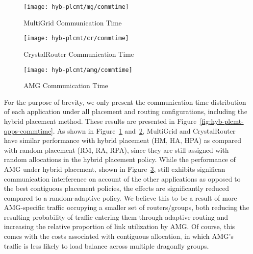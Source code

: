 
\begin{figure*}[t!]
    \centering
    \begin{subfigure}[t]{0.32\textwidth}
        \centering
        \texttt{[image: hyb-plcmt/mg/commtime]}
        \caption{MultiGrid Communication Time}
        \label{fig:hyb-plcmt-mg-commtime}
    \end{subfigure}\hfill
    \begin{subfigure}[t]{0.32\textwidth}
        \centering
        \texttt{[image: hyb-plcmt/cr/commtime]}
        \caption{CrystalRouter Communication Time}
        \label{fig:hyb-plcmt-cr-commtime}
    \end{subfigure}\hfill
    \begin{subfigure}[t]{0.32\textwidth}
        \centering
        \texttt{[image: hyb-plcmt/amg/commtime]}
        \caption{AMG Communication Time}
        \label{fig:hyb-plcmt-amg-commtime}
    \end{subfigure}
   \caption{Application communication time. Workload~ is running with all placement and routing configurations.}
   \label{fig:hyb-plcmt-apps-commtime}
\end{figure*}

For the purpose of brevity, we only present the
communication time distribution of each application under all placement and routing configurations, including the hybrid placement method. These results are presented in Figure~\ref{fig:hyb-plcmt-apps-commtime}. 
As shown in Figure~\ref{fig:hyb-plcmt-mg-commtime} and~\ref{fig:hyb-plcmt-cr-commtime},
MultiGrid and CrystalRouter have similar performance with hybrid placement (HM, HA, HPA) as compared with random placement (RM, RA, RPA),
since they are still assigned with random allocations in the hybrid placement policy. 
While the performance of AMG under hybrid placement, shown in Figure~\ref{fig:hyb-plcmt-amg-commtime}, still exhibits significan communication interference on account of the other applications as opposed to the best contiguous placement policies, the effects are significantly reduced compared to a random-adaptive policy. We believe this to be a result of more AMG-specific traffic occupying a smaller set of routers/groups, both reducing the resulting probability of traffic entering them through adaptive routing and increasing the relative proportion of link utilization by AMG. Of course, this comes with the costs associated with contiguous allocation, in which AMG's traffic is less likely to load balance across multiple dragonfly groups.

